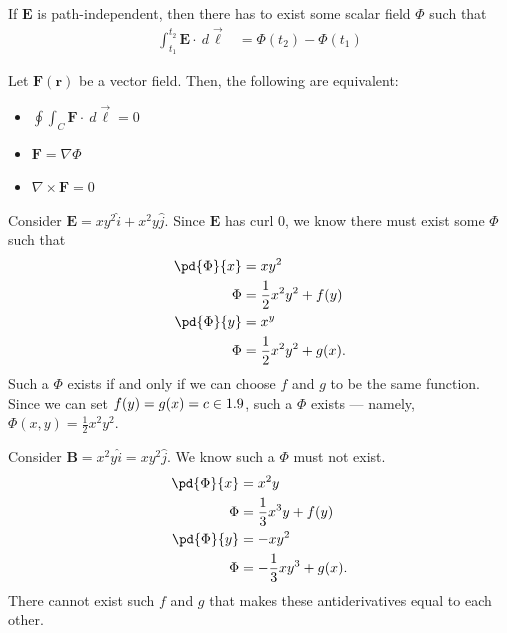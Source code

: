 \documentclass[10pt]{mypackage}
\begin{document}
If $\mathbf{E}$ is path-independent, then there has to exist some scalar field $\Phi$ such that
\begin{align*}
  \int_{t_1}^{t_2} \mathbf{E}\cdot\:d\vec{\ell} &= \Phi\left(t_2\right)- \Phi\left(t_1\right)
\end{align*}
\begin{definition}
Let $\mathbf{F}\left(\mathbf{r}\right)$ be a vector field. Then, the following are equivalent:
\begin{itemize}
  \item $\displaystyle \oint\int_{C}^{} \mathbf{F}\cdot\:d\vec{\ell} = 0$
  \item $\mathbf{F} = \nabla \Phi$
  \item $\nabla \times \mathbf{F}=0$
\end{itemize}
\end{definition}
\begin{example}
  Consider $\mathbf{E} = xy^2\widehat{i} + x^2y\widehat{j}$. Since $\mathbf{E}$ has curl $0$, we know there must exist some $\Phi$ such that
  \begin{align*}
    \pd{\Phi}{x} &= xy^2\\
    \Phi &= \frac{1}{2}x^2y^2 + f(y)\\
    \pd{\Phi}{y} &= x^y\\
    \Phi &= \frac{1}{2}x^2y^2 + g(x).
  \end{align*}
  Such a $\Phi$ exists if and only if we can choose $f$ and $g$ to be the same function. Since we can set $f(y) = g(x) = c\in 1.9$, such a $\Phi$ exists --- namely, $\Phi(x,y) = \frac{1}{2}x^2y^2$.\newline

  Consider $\mathbf{B} = x^2y\widehat{i} = xy^2\widehat{j}$. We know such a $\Phi$ must not exist.
  \begin{align*}
    \pd{\Phi}{x} &= x^2y\\
    \Phi &= \frac{1}{3}x^3y + f(y)\\
    \pd{\Phi}{y} &= -xy^2\\
    \Phi &= -\frac{1}{3}xy^3 + g(x).
  \end{align*}
  There cannot exist such $f$ and $g$ that makes these antiderivatives equal to each other.
\end{example}
\end{document}
